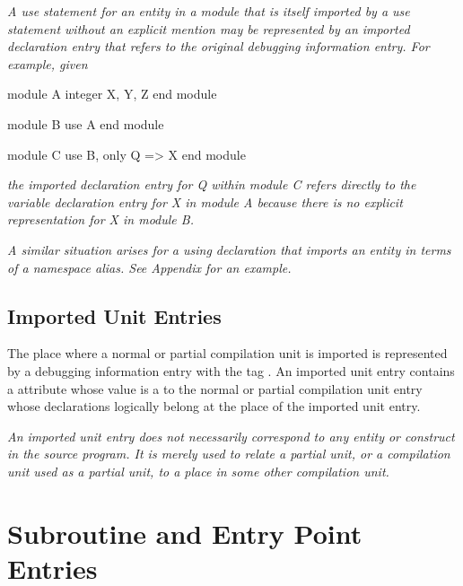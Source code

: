 \textit{A  use statement for an entity in a module that is
itself imported by a use statement without an explicit mention
may be represented by an imported declaration entry that refers
to the original debugging information entry. For example, given}
\par %
\vspace{2mm}
\begin{nlnlisting}
module A
integer X, Y, Z
end module

module B
use A
end module

module C
use B, only Q => X
end module

\end{nlnlisting}
\textit{the imported declaration entry for Q within module C refers
directly to the variable declaration entry for X in module A
because there is no explicit representation for X in module B.
}

\textit{A similar situation arises for a  using declaration
that imports an entity in terms of a namespace alias. See
Appendix  
for an example.
}

\subsection{Imported Unit Entries}
\label{chap:importedunitentries}
\hypertarget{chap:DWATimportimportedunit}{}
The place where a normal or partial compilation unit is imported is
represented by a debugging information entry with the
tag \DWTAGimportedunitTARG.
An imported unit entry contains a
\DWATimportDEFN{} attribute
whose value is a  to the
normal or partial compilation unit
\bb
entry
\eb
whose declarations logically
belong at the place of the imported unit entry.

\textit{An imported unit entry does not necessarily correspond to
any entity or construct in the source program. It is merely
 used to relate a partial unit, or a compilation
unit used as a partial unit, to a place in some other
compilation unit.}

\section{Subroutine and Entry Point Entries}
\label{chap:subroutineandentrypointentries}

